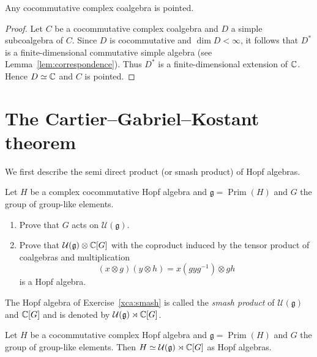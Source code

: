 \documentclass[12pt]{amsproc}
\begin{document}
\begin{theorem}
    Any cocommutative complex coalgebra is pointed.  
\end{theorem}

\begin{proof}
    Let $C$ be a cocommutative complex coalgebra and 
    $D$ a simple subcoalgebra of $C$. Since $D$ is cocommutative and $\dim D<\infty$, it follows that 
    $D^*$ is a finite-dimensional commutative simple algebra (see Lemma~\ref{lem:correspondence}). Thus $D^*$ is a finite-dimensional extension of $\mathbb{C}$. Hence $D\simeq\mathbb{C}$ and 
    $C$ is pointed. 
\end{proof}

\section{The Cartier--Gabriel--Kostant theorem}

We first describe 
the semi direct product (or smash product) 
of Hopf algebras. 


\begin{exercise}
\label{xca:smash}
Let $H$ be a complex cocommutative Hopf algebra and 
$\mathfrak{g}=\operatorname{Prim}(H)$ and 
$G$ the group 
of group-like elements.  
\begin{enumerate}
    \item Prove that $G$ acts on $\mathcal{U}(\mathfrak{g})$.    
    \item Prove that $\mathcal{U}(\mathfrak{g})\otimes\mathbb{C}[G]$ 
    with the coproduct induced by the tensor product of 
    coalgebras and multiplication
    \[
    (x\otimes g)(y\otimes h)=x(gyg^{-1})\otimes gh
    \]
    is a Hopf algebra. 
\end{enumerate}
\end{exercise}

The Hopf algebra of Exercise~\ref{xca:smash} is 
called the \emph{smash product} of $\mathcal{U}(\mathfrak{g})$ and $\mathbb{C}[G]$
and is denoted by $\mathcal{U}(\mathfrak{g})\rtimes\mathbb{C}[G]$. 

\begin{theorem}
    \label{thm:CartierGabrielKostant}
    Let $H$ be a cocommutative complex Hopf algebra 
    and $\mathfrak{g}=\operatorname{Prim}(H)$ and $G$ 
    the group of group-like elements. Then 
    $H\simeq\mathcal{U}(\mathfrak{g})\rtimes\mathbb{C}[G]$ as 
    Hopf algebras. 
\end{theorem}
\end{document}
